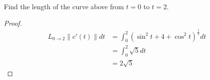 \documentclass[openany]{book}
\begin{document}
\begin{prob}
    Find the length of the curve above from $t=0$ to $t=2$.
\end{prob}
\begin{proof}
    \begin{align*}
        L_{0\to 2}\|c'(t)\|dt&=\int_0^2\left(\sin^2t+4+\cos^2t\right)^\frac{1}{2}dt\\
        &=\int_0^2\sqrt{5}dt\\
        &=2\sqrt{5}
    \end{align*}
\end{proof}
\end{document}
